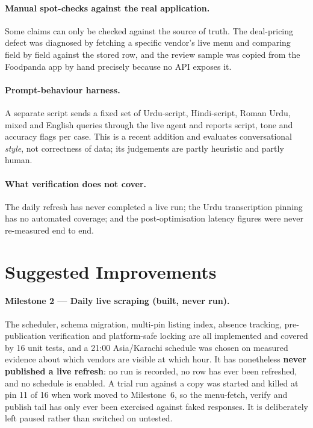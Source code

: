 \documentclass[11pt,a4paper]{article}
\begin{document}
\paragraph{Manual spot-checks against the real application.} Some claims can
only be checked against the source of truth. The deal-pricing defect was
diagnosed by fetching a specific vendor's live menu and comparing field by
field against the stored row, and the review sample was copied from the
Foodpanda app by hand precisely because no API exposes it.

\paragraph{Prompt-behaviour harness.} A separate script sends a fixed set of
Urdu-script, Hindi-script, Roman Urdu, mixed and English queries through the
live agent and reports script, tone and accuracy flags per case. This is a
recent addition and evaluates conversational \emph{style}, not correctness of
data; its judgements are partly heuristic and partly human.

\paragraph{What verification does not cover.} The daily refresh has never
completed a live run; the Urdu transcription pinning has no automated
coverage; and the post-optimisation latency figures were never re-measured
end to end.

\section{Suggested Improvements}

\paragraph{Milestone 2 --- Daily live scraping (built, never run).}
The scheduler, schema migration, multi-pin listing index, absence tracking,
pre-publication verification and platform-safe locking are all implemented and
covered by 16 unit tests, and a 21:00 Asia/Karachi schedule was chosen on
measured evidence about which vendors are visible at which hour. It has
nonetheless \textbf{never published a live refresh}: no run is recorded, no row
has ever been refreshed, and no schedule is enabled. A trial run against a
copy was started and killed at pin 11 of 16 when work moved to Milestone~6, so
the menu-fetch, verify and publish tail has only ever been exercised against
faked responses. It is deliberately left paused rather than switched on
untested.
\end{document}
